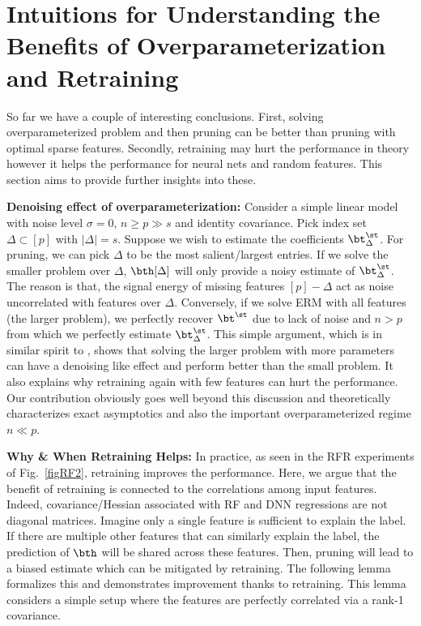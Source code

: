 \section{Intuitions for Understanding the Benefits of Overparameterization and Retraining}\label{sec intu}
So far we have a couple of interesting conclusions. First, solving overparameterized problem and then pruning can be better than pruning with optimal sparse features. Secondly, retraining may hurt the performance in theory however it helps the performance for neural nets and random features. This section aims to provide further insights into these.

\noindent\textbf{Denoising effect of overparameterization:} Consider a simple linear model with noise level $\sigma=0$, $n\geq p\gg s$ and identity covariance. Pick index set $\Delta\subset[p]$ with $|\Delta|=s$. Suppose we wish to estimate the coefficients $\bt^\st_{\Delta}$. For pruning, we can pick $\Delta$ to be the most salient/largest entries. If we solve the smaller problem over $\Delta$, $\bth[\Delta]$ will only provide a noisy estimate of $\bt^\st_{\Delta}$. The reason is that, the signal energy of missing features $[p]-\Delta$ act as noise uncorrelated with features over $\Delta$. Conversely, if we solve ERM with all features (the larger problem), we perfectly recover  $\bt^\st$ due to lack of noise and $n>p$ from which we perfectly estimate $\bt^\st_{\Delta}$. This simple argument, which is in similar spirit to \cite{}, shows that solving the larger problem with more parameters can have a denoising like effect and perform better than the small problem. It also explains why retraining again with few features can hurt the performance. Our contribution obviously goes well beyond this discussion and theoretically characterizes exact asymptotics and also the important overparameterized regime $n\ll p$.

\noindent\textbf{Why \& When Retraining Helps:} In practice, as seen in the RFR experiments of Fig.~\ref{figRF2}, retraining improves the performance. Here, we argue that the benefit of retraining is connected to the correlations among input features. Indeed, covariance/Hessian associated with RF and DNN regressions are not diagonal matrices. Imagine only a single feature is sufficient to explain the label. If there are multiple other features that can similarly explain the label, the prediction of $\bth$ will be shared across these features. Then, pruning will lead to a biased estimate which can be mitigated by retraining. The following lemma formalizes this and demonstrates improvement thanks to retraining. This lemma considers a simple setup where the features are perfectly correlated via a rank-1 covariance.%


